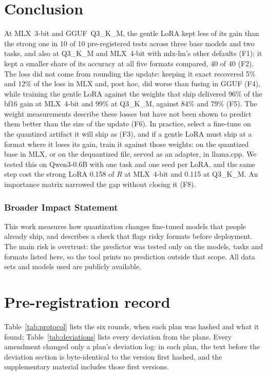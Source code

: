 \documentclass[10pt]{article}
\begin{document}
\section{Conclusion}
\label{sec:conclusion}

At MLX~3-bit and GGUF~Q3\_K\_M, the gentle LoRA kept less of its gain than the strong one in 10 of 10 pre-registered tests across three base models and two tasks, and also at Q3\_K\_M and MLX~4-bit with mlx-lm's other defaults (F1); it kept a smaller share of its accuracy at all five formats compared, 40 of 40 (F2). The loss did not come from rounding the update: keeping it exact recovered 5\% and 12\% of the loss in MLX and, post hoc, did worse than fusing in GGUF (F4), while training the gentle LoRA against the weights that ship delivered 96\% of the bf16 gain at MLX~4-bit and 99\% at Q3\_K\_M, against 84\% and 79\% (F5). The weight measurements describe these losses but have not been shown to predict them better than the size of the update (F6). In practice, select a fine-tune on the quantized artifact it will ship as (F3), and if a gentle LoRA must ship at a format where it loses its gain, train it against those weights: on the quantized base in MLX, or on the dequantized file, served as an adapter, in llama.cpp. We tested this on Qwen3-0.6B with one task and one seed per LoRA, and the same step cost the strong LoRA 0.158 of $R$ at MLX~4-bit and 0.115 at Q3\_K\_M. An importance matrix narrowed the gap without closing it (F8).

\subsubsection*{Broader Impact Statement}
This work measures how quantization changes fine-tuned models that people already ship, and describes a check that flags risky formats before deployment. The main risk is overtrust: the predictor was tested only on the models, tasks and formats listed here, so the tool prints no prediction outside that scope. All data sets and models used are publicly available.




\appendix

\section{Pre-registration record}
\label{app:deviations}

Table~\ref{tab:protocol} lists the six rounds, when each plan was hashed and what it found; Table~\ref{tab:deviations} lists every deviation from the plans. Every amendment changed only a plan's deviation log: in each plan, the text before the deviation section is byte-identical to the version first hashed, and the supplementary material includes those first versions.
\end{document}
